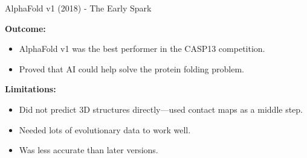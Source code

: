 \begin{frame}[allowframebreaks]{AlphaFold v1 (2018) - The Early Spark}
    \framebreak

    \textbf{Outcome:}
    \begin{itemize}
        \item AlphaFold v1 was the best performer in the CASP13 competition.
        \item Proved that AI could help solve the protein folding problem.
    \end{itemize}

    \textbf{Limitations:}
    \begin{itemize}
        \item Did not predict 3D structures directly—used contact maps as a middle step.
        \item Needed lots of evolutionary data to work well.
        \item Was less accurate than later versions.
    \end{itemize}
\end{frame}


